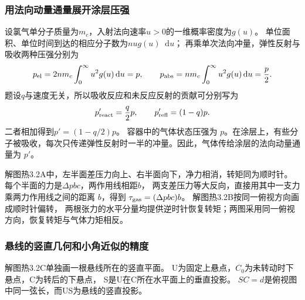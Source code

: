 \documentclass[UTF8,fontset=fandol,a4paper,11pt]{ctexart}
\newcommand{\dd}{\mathop{}\!\mathrm{d}}
\begin{document}
\subsubsection*{用法向动量通量展开涂层压强}
设氯气单分子质量为$m_c$，入射法向速率$u>0$的一维概率密度为$g(u)$。
单位面积、单位时间到达的相应分子数为$nu g(u)\dd u$；
再乘单次法向冲量，弹性反射与吸收两种压强分别为
\[
p_{\rm el}=2nm_c\int_0^\infty u^2g(u)\dd u=p,\qquad
p_{\rm abs}=nm_c\int_0^\infty u^2g(u)\dd u=\frac p2.
\]
题设$q$与速度无关，所以吸收反应和未反应反射的贡献可分别写为
\[
p'_{\rm react}=\frac q2p,\qquad
p'_{\rm refl}=(1-q)p.
\]
二者相加得到$p'=(1-q/2)p$。
容器中的气体状态压强为 $p$。在涂层上，有些分子被吸收，每次只传递弹性反射时一半的冲量。因此，气体传给涂层的法向动量通量为 $p'$。

解图热3.2A中，左半面差压力向上、右半面向下，净力相消，转矩同为顺时针。
每个半面的力是$\Delta pbc$，两作用线相距$b$，
两支差压力等大反向，直接用其中一支力乘两力作用线之间的距离 $b$，得到 $\tau_{\rm gas}=(\Delta pbc)b$。
解图热3.2B按同一俯视方向画成顺时针偏转，
两根张力的水平分量均提供逆时针恢复转矩；两图采用同一俯视方向，恢复转矩与气体力矩相反。

\subsubsection*{悬线的竖直几何和小角近似的精度}
解图热3.2C单独画一根悬线所在的竖直平面。
U为固定上悬点，$C_0$为未转动时下悬点，C为转后的下悬点，
S是U在C所在水平面上的垂直投影。
$SC=d$是俯视图中同一弦长，而US为悬线的竖直投影。
\end{document}
